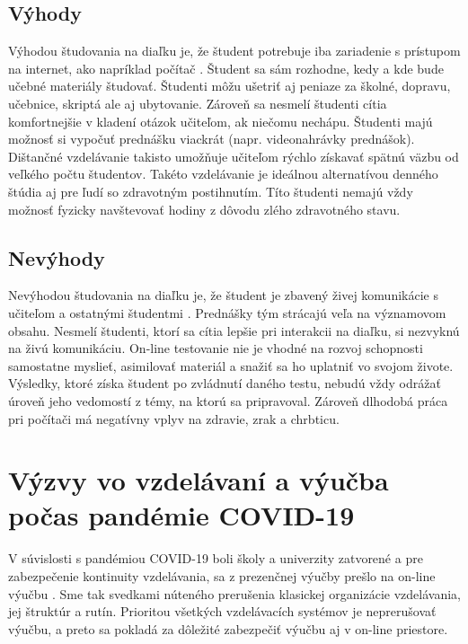 \documentclass[10pt,oneside,slovak,a4paper]{article}
\begin{document}
\subsection{Výhody}
Výhodou študovania na diaľku je, že študent potrebuje iba zariadenie s prístupom na internet, ako napríklad počítač \cite{Sokolova2018}.
Študent sa sám rozhodne, kedy a kde bude učebné materiály študovať. Študenti môžu ušetriť aj peniaze za školné, dopravu, učebnice, skriptá ale aj ubytovanie.
Zároveň sa nesmelí študenti cítia komfortnejšie v kladení otázok učiteľom, ak niečomu nechápu. Študenti majú možnosť si vypočuť prednášku viackrát (napr. videonahrávky prednášok).
Dištančné vzdelávanie takisto umožňuje učiteľom rýchlo získavať spätnú väzbu od veľkého počtu študentov.
Takéto vzdelávanie je ideálnou alternatívou denného štúdia aj pre ľudí so zdravotným postihnutím.
Títo študenti nemajú vždy možnosť fyzicky navštevovať hodiny z dôvodu zlého zdravotného stavu.

\subsection{Nevýhody}
Nevýhodou študovania na diaľku je, že študent je zbavený živej komunikácie s učiteľom a ostatnými študentmi \cite{Sokolova2018}. Prednášky tým strácajú veľa na významovom obsahu.
Nesmelí študenti, ktorí sa cítia lepšie pri interakcii na diaľku, si nezvyknú na živú komunikáciu.
On-line testovanie nie je vhodné na rozvoj schopnosti samostatne myslieť, asimilovať materiál a snažiť sa ho uplatniť vo svojom živote.
Výsledky, ktoré získa študent po zvládnutí daného testu, nebudú vždy odrážať úroveň jeho vedomostí z témy, na ktorú sa pripravoval.
Zároveň dlhodobá práca pri počítači má negatívny vplyv na zdravie, zrak a chrbticu.


\section{Výzvy vo vzdelávaní a výučba počas pandémie COVID-19}
V súvislosti s pandémiou COVID-19 boli školy a univerzity zatvorené a pre zabezpečenie kontinuity vzdelávania, sa z prezenčnej výučby prešlo na on-line výučbu \cite{covid19}.
Sme tak svedkami núteného prerušenia klasickej organizácie vzdelávania, jej štruktúr a rutín. Prioritou všetkých vzdelávacích systémov je neprerušovať výučbu,
a preto sa pokladá za dôležité zabezpečiť výučbu aj v on-line priestore.
\end{document}
